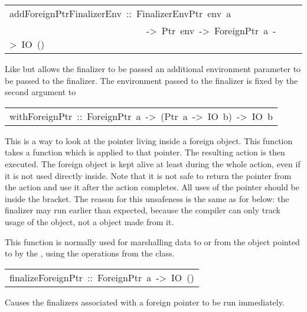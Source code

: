 \begin{haddockdesc}
\item[\begin{tabular}{@{}l}
addForeignPtrFinalizerEnv\ ::\ FinalizerEnvPtr\ env\ a\\\ \ \ \ \ \ \ \ \ \ \ \ \ \ \ \ \ \ \ \ \ \ \ \ \ \ \ \ \ ->\ Ptr\ env\ ->\ ForeignPtr\ a\ ->\ IO\ ()
\end{tabular}]\haddockbegindoc
Like  but allows the finalizer to be
 passed an additional environment parameter to be passed to the
 finalizer.  The environment passed to the finalizer is fixed by the
 second argument to 
\par

\end{haddockdesc}
\begin{haddockdesc}
\item[\begin{tabular}{@{}l}
withForeignPtr\ ::\ ForeignPtr\ a\ ->\ (Ptr\ a\ ->\ IO\ b)\ ->\ IO\ b
\end{tabular}]\haddockbegindoc
This is a way to look at the pointer living inside a
 foreign object.  This function takes a function which is
 applied to that pointer. The resulting  action is then
 executed. The foreign object is kept alive at least during
 the whole action, even if it is not used directly
 inside. Note that it is not safe to return the pointer from
 the action and use it after the action completes. All uses
 of the pointer should be inside the
  bracket.  The reason for
 this unsafeness is the same as for
  below: the finalizer
 may run earlier than expected, because the compiler can only
 track usage of the  object, not
 a  object made from it.
\par
This function is normally used for marshalling data to
 or from the object pointed to by the
 , using the operations from the
  class.
\par

\end{haddockdesc}
\begin{haddockdesc}
\item[\begin{tabular}{@{}l}
finalizeForeignPtr\ ::\ ForeignPtr\ a\ ->\ IO\ ()
\end{tabular}]\haddockbegindoc
Causes the finalizers associated with a foreign pointer to be run
 immediately.
\par

\end{haddockdesc}
